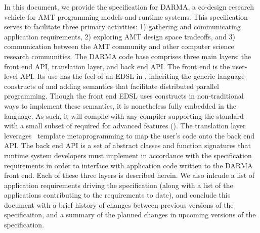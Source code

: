 
In this document, we provide the specification for DARMA,
a co-design research vehicle for \gls{AMT} programming models and runtime
systems.  This specification serves to facilitate three primary activities: 
1) gathering and communicating application requirements, 2) exploring AMT
design space tradeoffs, and 3) communication between the AMT community and
other computer science research communities.
The DARMA code base comprises three main layers: the \gls{front end} \gls{API},
\gls{translation layer}, and
\gls{back end} \gls{API}.  
The \gls{front end} is the user-level \gls{API}. 
Its use has the feel of an \gls{EDSL} in \CC,  inheriting the generic
language constructs of \CC and adding \gls{semantics} that facilitate
distributed parallel programming.  Though the \gls{front end} \gls{EDSL} uses
\CC constructs in non-traditional ways to implement these semantics, it is
nonetheless fully embedded in the \CC language. As such, it will compile with any
\CC compiler supporting the  standard with a small subset of 
required for advanced features ().  
The \gls{translation layer} leverages \CC\ \gls{template
metaprogramming} to map the user's code onto the \gls{back end} \gls{API}.
The \gls{back end} \gls{API} is a set of abstract classes and function
signatures that runtime system developers must implement in accordance with the
specification requirements in order to interface with application code written
to the DARMA front end.  
Each of these three layers is described herein. We also
inlcude a list of application requirements driving the specification (along
with a list of the applications contributing to the requirements to date), and
conclude this document with a brief history of changes between previous
versions of the specificaiton, and a summary of the planned changes in upcoming
versions of the specification.

